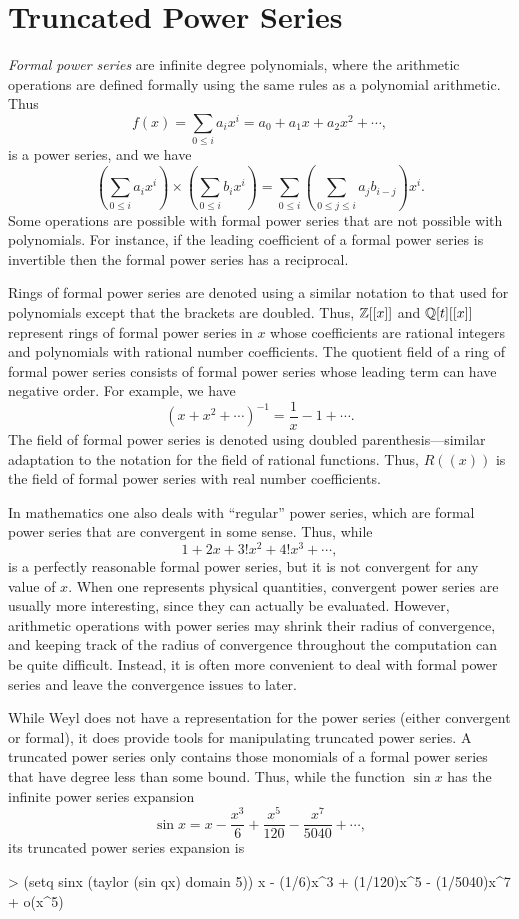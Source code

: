 \chapter{Truncated Power Series}
\label{Series:Chap}

{\em Formal power series} are infinite degree
polynomials, where the arithmetic operations are defined
formally using the same rules as a polynomial arithmetic.
Thus
\[
f(x) = \sum_{0\le i} a_i x^i = a_0 + a_1 x + a_2 x^2 + \cdots,
\]
is a power series, and we have
\[
\left(\sum_{0\le i} a_i x^i\right) \times 
\left(\sum_{0\le i} b_i x^i\right) =
\sum_{0 \le i} \left(\sum_{0\le j \le i} a_j b_{i-j}\right) x^i .
\]
Some operations are possible with formal power series that are not
possible with polynomials. For instance, if the leading coefficient of
a formal power series is invertible then the formal power series has a
reciprocal.
  
Rings of formal power series are denoted using a similar notation to
that used for polynomials except that the brackets are doubled. Thus,
${\Bbb Z}[[x]]$ and ${\Bbb Q}[t][[x]]$ represent rings of formal power series in
$x$ whose coefficients are rational integers and polynomials with
rational number coefficients. The quotient field of a ring of formal
power series consists of formal power series whose leading term can
have negative order. For example, we have
\[
\left(x + x^2 + \cdots \right)^{-1} = \frac{1}{x} - 1 + \cdots.
\]
The field of formal power series is denoted using doubled
parenthesis---similar adaptation to the notation for the field of
rational functions.  Thus, $R((x))$ is the field of formal power
series with real number coefficients.

In mathematics one also deals with ``regular'' power series, which are
formal power series that are convergent in some sense.  Thus, while
\[
1 + 2x + 3! x^2 + 4!x^3 + \cdots,
\]
is a perfectly reasonable formal power series, but it is not
convergent for any value of $x$.  When one represents physical
quantities, convergent power series are usually more interesting,
since they can actually be evaluated.  However, arithmetic operations
with power series may shrink their radius of convergence, and keeping
track of the radius of convergence throughout the computation can be
quite difficult.  Instead, it is often more convenient to deal with
formal power series and leave the convergence issues to later.
  
While Weyl does not have a representation for the power series (either
convergent or formal), it does provide tools for manipulating
truncated power series. A truncated power series only contains those
monomials of a formal power series that have degree less than some
bound. Thus, while the function $\sin x$ has the infinite power series
expansion
\[
\sin x = x - \frac{x^3}{6} + \frac{x^5}{120} - \frac{x^7}{5040} +
\cdots, 
\]
its truncated power series expansion is
\begin{code}
> (setq sinx (taylor (sin qx) domain 5))
x - (1/6)x^3 + (1/120)x^5 - (1/5040)x^7 + o(x^5)
\end{code}

